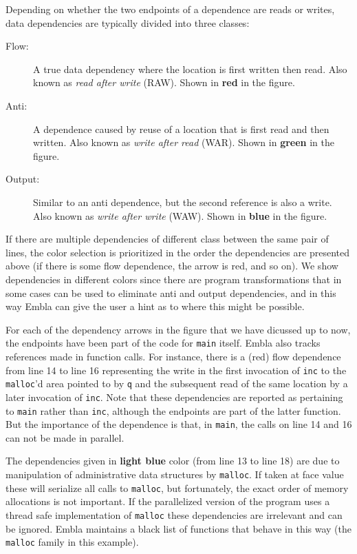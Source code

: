 \documentclass{acm_proc_article-sp}
\begin{document}
Depending on whether the two endpoints of a dependence
are reads or writes, data dependencies are typically divided into 
three classes:
\begin{description}
\item[Flow:]
A true data dependency where the location is first written then
read. Also known as {\em read after write} (RAW). Shown in 
{\bf \color{red} red} in the figure.
\item[Anti:]
A dependence caused by reuse of a location that is first read and then
written. Also known as {\em write after read} (WAR). Shown in 
{\bf \color{green} green} in the figure.
\item[Output:]
Similar to an anti dependence, but the second reference is also a
write. Also known as {\em write after write} (WAW). Shown in 
{\bf \color{blue} blue} in the figure.
\end{description}
If there are multiple dependencies of different class between the 
same pair of lines, the color selection is prioritized in the
order the dependencies are presented above (if there is
some flow dependence, the arrow is red, and so on). 
We show dependencies in different colors since there are program
transformations that in some cases can be used to eliminate anti and
output
dependencies, and in this way Embla can give the user a hint as 
to where this might be possible.

For each of the dependency arrows in the figure that 
we have dicussed up to now, the endpoints have been part of the 
code for {\tt main}
itself. Embla also tracks references made in function calls. For
instance, there is a (red) flow dependence from line 14 to line 16
representing the write in the first invocation of {\tt inc} to the 
{\tt malloc}'d area pointed to by {\tt q} and the subsequent read 
of the same location by a later invocation of {\tt inc}. 
Note that these dependencies 
are reported as pertaining to {\tt main} rather than {\tt inc},
although the endpoints are part of the latter function. 
But the importance of the dependence is that, in {\tt main}, the calls
on line 14 and 16 can not be made in parallel.

The dependencies given in {\bf \color{cyan}light blue} color 
(from line 13 to line 18) are due to manipulation of administrative 
data structures by {\tt malloc}. If taken at face value these will
serialize all calls to {\tt malloc}, but fortunately, the exact order
of memory allocations is not important. If the 
parallelized version of the program uses a thread safe 
implementation of {\tt malloc} these dependencies are irrelevant and
can be ignored. Embla maintains a black list of functions that behave 
in this way (the {\tt malloc} family in this example).
\end{document}

